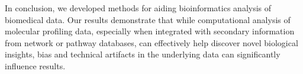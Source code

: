 In conclusion, we developed methods for aiding bioinformatics analysis of biomedical data. Our results demonstrate that while computational analysis of molecular profiling data, especially when integrated with secondary information from network or pathway databases, can effectively help discover novel biological insights, bias and technical artifacts in the underlying data can significantly influence results.

